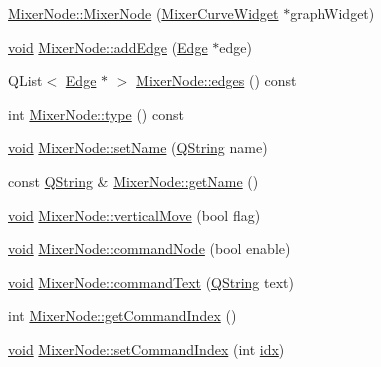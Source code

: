 \begin{DoxyCompactItemize}
\item 
\hyperlink{group___u_a_v_object_widget_utils_gad99e53701553bdb4852ccedd6362f5a2}{\-Mixer\-Node\-::\-Mixer\-Node} (\hyperlink{class_mixer_curve_widget}{\-Mixer\-Curve\-Widget} $\ast$graph\-Widget)
\item 
\hyperlink{group___u_a_v_objects_plugin_ga444cf2ff3f0ecbe028adce838d373f5c}{void} \hyperlink{group___u_a_v_object_widget_utils_gaf8a1ccdbffed70e2995e75d37c57851c}{\-Mixer\-Node\-::add\-Edge} (\hyperlink{class_edge}{\-Edge} $\ast$edge)
\item 
\-Q\-List$<$ \hyperlink{class_edge}{\-Edge} $\ast$ $>$ \hyperlink{group___u_a_v_object_widget_utils_ga40ed4006b807a83e49d061ed3d2660d2}{\-Mixer\-Node\-::edges} () const 
\item 
int \hyperlink{group___u_a_v_object_widget_utils_gab4486e1ba0c3c072c94654c3af32b0c6}{\-Mixer\-Node\-::type} () const 
\item 
\hyperlink{group___u_a_v_objects_plugin_ga444cf2ff3f0ecbe028adce838d373f5c}{void} \hyperlink{group___u_a_v_object_widget_utils_gadfd7806c5496ba5afcd31e2965292feb}{\-Mixer\-Node\-::set\-Name} (\hyperlink{group___u_a_v_objects_plugin_gab9d252f49c333c94a72f97ce3105a32d}{\-Q\-String} name)
\item 
const \hyperlink{group___u_a_v_objects_plugin_gab9d252f49c333c94a72f97ce3105a32d}{\-Q\-String} \& \hyperlink{group___u_a_v_object_widget_utils_gade160748ca597706039a14036cf2cf49}{\-Mixer\-Node\-::get\-Name} ()
\item 
\hyperlink{group___u_a_v_objects_plugin_ga444cf2ff3f0ecbe028adce838d373f5c}{void} \hyperlink{group___u_a_v_object_widget_utils_ga611004aca7ff8a9568500f208f9e4dd8}{\-Mixer\-Node\-::vertical\-Move} (bool flag)
\item 
\hyperlink{group___u_a_v_objects_plugin_ga444cf2ff3f0ecbe028adce838d373f5c}{void} \hyperlink{group___u_a_v_object_widget_utils_ga3eb17fc4cf477877868bb1d9cc4baad9}{\-Mixer\-Node\-::command\-Node} (bool enable)
\item 
\hyperlink{group___u_a_v_objects_plugin_ga444cf2ff3f0ecbe028adce838d373f5c}{void} \hyperlink{group___u_a_v_object_widget_utils_ga549e0ca95a0402dfc301e141de9e269e}{\-Mixer\-Node\-::command\-Text} (\hyperlink{group___u_a_v_objects_plugin_gab9d252f49c333c94a72f97ce3105a32d}{\-Q\-String} text)
\item 
int \hyperlink{group___u_a_v_object_widget_utils_ga9256f0cba8c457485bfc00b660076d2b}{\-Mixer\-Node\-::get\-Command\-Index} ()
\item 
\hyperlink{group___u_a_v_objects_plugin_ga444cf2ff3f0ecbe028adce838d373f5c}{void} \hyperlink{group___u_a_v_object_widget_utils_ga85c1946a33e5309ac2b9aa3675671935}{\-Mixer\-Node\-::set\-Command\-Index} (int \hyperlink{uavobjecttemplate_8m_a49654e4709f40aecccada266daa32fc6}{idx})

\end{DoxyCompactItemize}
